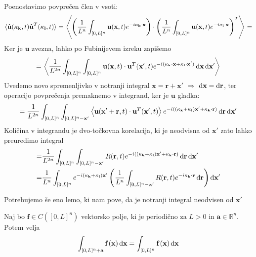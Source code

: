 \documentclass[mat2, tisk]{fmfdelo}
\newcommand{\R}{\mathbb R}
\newcommand{\bd}{\textbf}
\begin{document}
Poenostavimo povprečen člen v vsoti: 
\begin{align*}
  \langle \hat{\bd{u}}(\bd{\text{$\kappa$}}_\bd{k}, t) \hat{\bd{u}}^T(\bd{\text{$\kappa$}}_\bd{l}, t) \rangle = \left\langle \left(\frac{1}{L^n} \int_{[0, L]^n} \bd{u}(\bd{x}, t) e^{-i\bd{\text{$\kappa$}}_{\bd{k}}\cdot \bd{x}} \right) \cdot \left(\frac{1}{L^n} \int_{[0, L]^n} \bd{u}(\bd{x}, t) e^{-i\bd{\text{$\kappa$}}_\bd{l} \cdot \bd{x}} \right)^T \right\rangle = 
\end{align*}
Ker je $\bd{u}$ zvezna, lahko po Fubinijevem izreku zapišemo 
\begin{align*}
= \left\langle \frac{1}{L^{2n}} \int_{[0, L]^{n}} \int_{[0, L]^{n}} \bd{u}(\bd{x}, t) \cdot \bd{u}^T(\bd{x}', t) e^{-i(\bd{\text{$\kappa$}}_{\bd{k}}\cdot \bd{x} + \bd{\text{$\kappa$}}_{\bd{l}}\cdot \bd{x}')} \dif\bd{x} \dif\bd{x}' \right\rangle
\end{align*}
Uvedemo novo spremenljivko v notranji integral $\bd{x} = \bd{r} + \bd{x}'$ $\Longrightarrow$ $\dif\bd{x} = \dif\bd{r}$, ter operacijo povprečenja premaknemo v integrand, ker 
je $\bd{u}$ gladka:
\begin{align*}
= \frac{1}{L^{2n}} \int_{[0, L]^{n}} \int_{[0, L]^{n} - \bd{x}'} \left\langle\bd{u}(\bd{x}' + \bd{r}, t) \cdot \bd{u}^T(\bd{x}', t)\right\rangle  e^{-i((\bd{\text{$\kappa$}}_{\bd{k}} + \bd{\text{$\kappa$}}_{\bd{l}})\bd{x}' + \bd{\text{$\kappa$}}_{\bd{k}} \cdot \bd{r})} \dif\bd{r} \dif\bd{x}' 
\end{align*}
Količina v integrandu je dvo-točkovna korelacija, ki je neodvisna od $\bd{x}'$
zato lahko preuredimo integral 
\begin{align*}
  =& \frac{1}{L^{2n}} \int_{[0, L]^{n}} \int_{[0, L]^{n} - \bd{x}'} R(\bd{r}, t) e^{-i((\bd{\text{$\kappa$}}_{\bd{k}} + \bd{\text{$\kappa$}}_{\bd{l}})\bd{x}' + \bd{\text{$\kappa$}}_{\bd{k}} \cdot \bd{r})} \dif\bd{r} \dif\bd{x}' \\
  =& \frac{1}{L^{n}} \int_{[0, L]^{n}} e^{-i(\bd{\text{$\kappa$}}_{\bd{k}} + \bd{\text{$\kappa$}}_{\bd{l}})\bd{x}'}\left(\frac{1}{L^n}\int_{[0, L]^{n} - \bd{x}'} R(\bd{r}, t) e^{-i\bd{\text{$\kappa$}}_{\bd{k}} \cdot \bd{r}} \dif\bd{r}\right) \dif\bd{x}'
\end{align*}

Potrebujemo še eno lemo, ki nam pove, da je notranji integral 
neodvisen od $\bd{x}'$

\begin{lema}
Naj bo $\bd{f} \in C([0, L]^n)$ vektorsko polje, ki je periodično za 
$L>0$ in $\bd{a}\in \R^n$. Potem velja 
\begin{equation*}
\int_{[0, L]^n + \bd{a}}\bd{f}\,(\bd{x}) \dif\bd{x} = \int_{[0, L]^n} \bd{f}\,(\bd{x}) \dif\bd{x}
\end{equation*} 
\end{lema}
\end{document}

